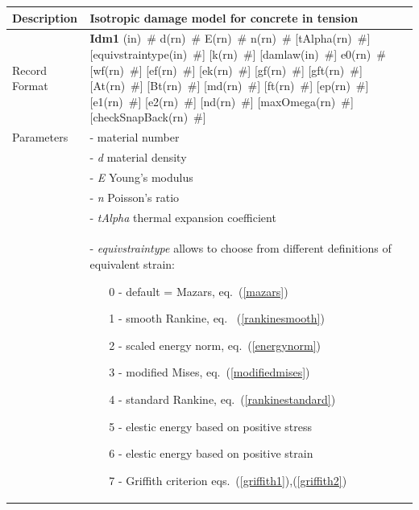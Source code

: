 \documentclass[a4paper]{article}
\newcommand{\descitem}[1]{{\noindent \bf #1}}
\newcommand{\elemparam}[2]{{{#1\tiny (#2)}~\#}}
\newcommand{\param}[1]{{\it #1}}
\begin{document}
\begin{longtable}{|l|p{9cm}|}

\hline
Description & Isotropic damage model for concrete in tension\\
\hline
Record Format & \descitem{Idm1} 
\elemparam{}{in} 
\elemparam{d}{rn} 
\elemparam{E}{rn}
\elemparam{n}{rn} 
[\elemparam{tAlpha}{rn}] 
[\elemparam{equivstraintype}{in}] 
[\elemparam{k}{rn}]
[\elemparam{damlaw}{in}] 
\elemparam{e0}{rn}
[\elemparam{wf}{rn}] 
[\elemparam{ef}{rn}]
[\elemparam{ek}{rn}]
[\elemparam{gf}{rn}]
[\elemparam{gft}{rn}]
[\elemparam{At}{rn}] 
[\elemparam{Bt}{rn}] 
[\elemparam{md}{rn}] 
[\elemparam{ft}{rn}] 
[\elemparam{ep}{rn}] 
[\elemparam{e1}{rn}] 
[\elemparam{e2}{rn}] 
[\elemparam{nd}{rn}] 
[\elemparam{maxOmega}{rn}]
[\elemparam{checkSnapBack}{rn}]\\
Parameters &- \param{} material number\\
&- \param{d} material density\\
&- \param{E} Young's modulus\\
&- \param{n} Poisson's ratio\\
&- \param{tAlpha} thermal expansion coefficient\\
&- \param{equivstraintype} allows to choose from different definitions
of equivalent strain:
\begin{itemize}\setlength{\itemsep}{-3pt}
\item[0 -] default = Mazars, eq.~(\ref{mazars})
\item[1 -] smooth Rankine, eq.~ (\ref{rankinesmooth})
\item[2 -] scaled energy norm,  eq.~(\ref{energynorm})
\item[3 -] modified Mises, eq.~(\ref{modifiedmises})
\item[4 -] standard Rankine, eq.~(\ref{rankinestandard})
\item[5 -] elestic energy based on positive stress
\item[6 -] elestic energy based on positive strain
\item[7 -] Griffith criterion eqs.~(\ref{griffith1}),(\ref{griffith2})


\end{itemize}
\end{longtable}
\end{document}

